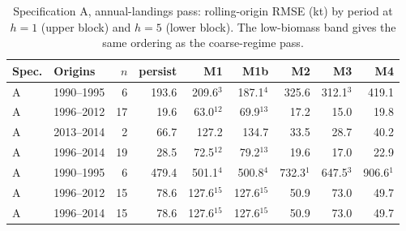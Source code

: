 \documentclass[preprint,11pt,authoryear]{elsarticle}
\theoremstyle{remark}
\begin{document}
\begin{table}[!htb]
\centering\footnotesize\setlength{\tabcolsep}{3.5pt}
\caption{Specification A, annual-landings pass: rolling-origin RMSE (kt) by period at $h=1$ (upper block) and $h=5$ (lower block). The low-biomass band gives the same ordering as the coarse-regime pass.}
\label{tab:si_annual}
\begin{tabular}{@{}llrrrrrrr@{}}
\toprule
Spec. & Origins & $n$ & persist & M1 & M1b & M2 & M3 & M4 \\
\midrule
A & 1990--1995 & 6 & 193.6 & 209.6$^{3}$ & 187.1$^{4}$ & 325.6 & 312.1$^{3}$ & 419.1 \\
A & 1996--2012 & 17 & 19.6 & 63.0$^{12}$ & 69.9$^{13}$ & 17.2 & 15.0 & 19.8 \\
A & 2013--2014 & 2 & 66.7 & 127.2 & 134.7 & 33.5 & 28.7 & 40.2 \\
A & 1996--2014 & 19 & 28.5 & 72.5$^{12}$ & 79.2$^{13}$ & 19.6 & 17.0 & 22.9 \\
\midrule
A & 1990--1995 & 6 & 479.4 & 501.1$^{4}$ & 500.8$^{4}$ & 732.3$^{1}$ & 647.5$^{3}$ & 906.6$^{1}$ \\
A & 1996--2012 & 15 & 78.6 & 127.6$^{15}$ & 127.6$^{15}$ & 50.9 & 73.0 & 49.7 \\
A & 1996--2014 & 15 & 78.6 & 127.6$^{15}$ & 127.6$^{15}$ & 50.9 & 73.0 & 49.7 \\
\bottomrule
\end{tabular}
\end{table}
\end{document}
